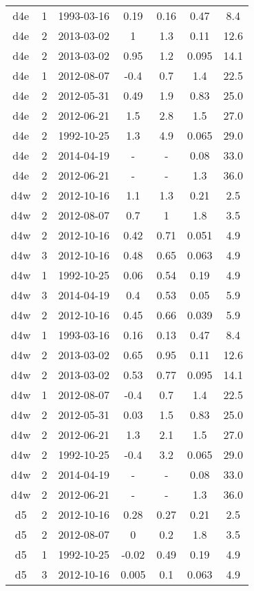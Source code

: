 \begin{table*}[htp]
\begin{tabular}{ccccccc}
d4e & 1 & 1993-03-16 & 0.19 & 0.16 & 0.47 & 8.4 \\
d4e & 2 & 2013-03-02 & 1 & 1.3 & 0.11 & 12.6 \\
d4e & 2 & 2013-03-02 & 0.95 & 1.2 & 0.095 & 14.1 \\
d4e & 1 & 2012-08-07 & -0.4 & 0.7 & 1.4 & 22.5 \\
d4e & 2 & 2012-05-31 & 0.49 & 1.9 & 0.83 & 25.0 \\
d4e & 2 & 2012-06-21 & 1.5 & 2.8 & 1.5 & 27.0 \\
d4e & 2 & 1992-10-25 & 1.3 & 4.9 & 0.065 & 29.0 \\
d4e & 2 & 2014-04-19 & - & - & 0.08 & 33.0 \\
d4e & 2 & 2012-06-21 & - & - & 1.3 & 36.0 \\
d4w & 2 & 2012-10-16 & 1.1 & 1.3 & 0.21 & 2.5 \\
d4w & 2 & 2012-08-07 & 0.7 & 1 & 1.8 & 3.5 \\
d4w & 2 & 2012-10-16 & 0.42 & 0.71 & 0.051 & 4.9 \\
d4w & 3 & 2012-10-16 & 0.48 & 0.65 & 0.063 & 4.9 \\
d4w & 1 & 1992-10-25 & 0.06 & 0.54 & 0.19 & 4.9 \\
d4w & 3 & 2014-04-19 & 0.4 & 0.53 & 0.05 & 5.9 \\
d4w & 2 & 2012-10-16 & 0.45 & 0.66 & 0.039 & 5.9 \\
d4w & 1 & 1993-03-16 & 0.16 & 0.13 & 0.47 & 8.4 \\
d4w & 2 & 2013-03-02 & 0.65 & 0.95 & 0.11 & 12.6 \\
d4w & 2 & 2013-03-02 & 0.53 & 0.77 & 0.095 & 14.1 \\
d4w & 1 & 2012-08-07 & -0.4 & 0.7 & 1.4 & 22.5 \\
d4w & 2 & 2012-05-31 & 0.03 & 1.5 & 0.83 & 25.0 \\
d4w & 2 & 2012-06-21 & 1.3 & 2.1 & 1.5 & 27.0 \\
d4w & 2 & 1992-10-25 & -0.4 & 3.2 & 0.065 & 29.0 \\
d4w & 2 & 2014-04-19 & - & - & 0.08 & 33.0 \\
d4w & 2 & 2012-06-21 & - & - & 1.3 & 36.0 \\
d5 & 2 & 2012-10-16 & 0.28 & 0.27 & 0.21 & 2.5 \\
d5 & 2 & 2012-08-07 & 0 & 0.2 & 1.8 & 3.5 \\
d5 & 1 & 1992-10-25 & -0.02 & 0.49 & 0.19 & 4.9 \\
d5 & 3 & 2012-10-16 & 0.005 & 0.1 & 0.063 & 4.9 \\

\end{tabular}
\end{table*}

